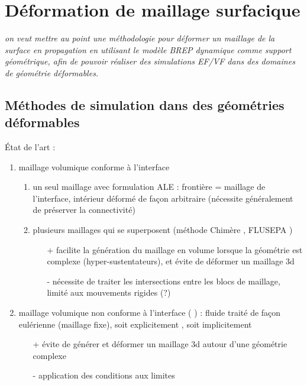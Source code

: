 \chapter{Déformation de maillage surfacique}

\textit{on veut mettre au point une méthodologie pour déformer un maillage de la surface en propagation en utilisant le modèle BREP dynamique comme support géométrique, afin de pouvoir réaliser des simulations EF/VF dans des domaines de géométrie déformables.}

\section{Méthodes de simulation dans des géométries déformables}
État de l'art :
\begin{enumerate}
	\item maillage volumique conforme à l'interface
	\begin{enumerate}
		\item\label{item:ale} un seul maillage  avec formulation ALE : frontière = maillage de l'interface, intérieur déformé de façon arbitraire (nécessite généralement de préserver la connectivité)
		\item plusieurs maillages  qui se superposent (méthode Chimère \cite{meakin1989, wang2000}, FLUSEPA \cite{brenner1991} ) 
		\begin{itemize}
			\item[+] facilite la génération du maillage en volume lorsque la géométrie est complexe (\eg hyper-sustentateurs), et évite de déformer un maillage 3d
			\item[-] nécessite de traiter les intersections entre les blocs de maillage, limité aux mouvements rigides (?)
		\end{itemize}
	\end{enumerate}
	\item maillage volumique non conforme à l'interface ( \cite{peskin2002}) : fluide traité de façon eulérienne (maillage fixe), soit explicitement \cite{wang2012, hovnanian2012}{\color{gray},  soit implicitement \cite{bruchon2009}}
	\begin{itemize}
		\item[+] évite de générer et déformer un maillage 3d autour d'une géométrie complexe
		\item[-] application des conditions aux limites
	\end{itemize}
\end{enumerate}

